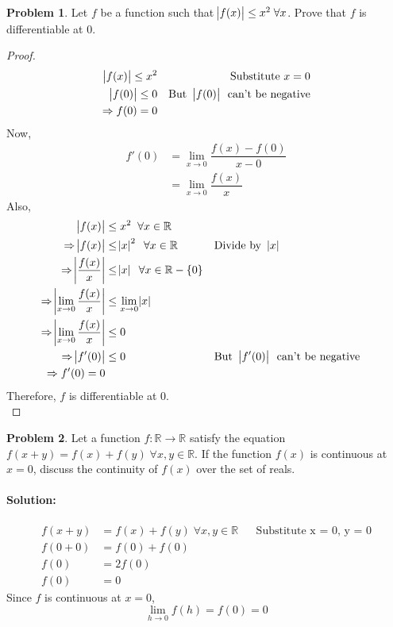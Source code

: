 \documentclass[14]{article}
\theoremstyle{definition}
\newtheorem{prob}{Problem}
\begin{document}
\pagebreak
\begin{prob}
Let $f$ be a function such that $\abs{f(x)} \leq x^2 \; \forall x$. Prove that $f$ is differentiable at 0.
\begin{proof}
\begin{align*}
\abs{f(x)} \leq x^2 && \text{Substitute $x = 0$}\\
\abs{f(0)} \leq 0 && \text{But \abs{f(0)} can't be negative}\\
\Rightarrow f(0) = 0
\end{align*}
Now,
\begin{align*}
f'(0) &= \lim\limits_{x \to 0} \dfrac{f(x) - f(0)}{x - 0}\\
&= \lim\limits_{x \to 0} \dfrac{f(x)}{x}
\end{align*}
Also,
\begin{align*}
\abs{f(x)} &\leq x^2 \;\; \forall x \in \mathbb{R}\\
\Rightarrow \abs{f(x)} &\leq \abs{x}^2\;\; \forall x \in \mathbb{R} && \text{Divide by \abs{x}}\\
\Rightarrow \abs{\dfrac{f(x)}{x}} &\leq \abs{x}\;\; \forall x \in \mathbb{R} - \{0\}\\
\Rightarrow \abs{\lim\limits_{x \to 0} \dfrac{f(x)}{x}} &\leq \lim\limits_{x \to 0} \abs{x}\\
\Rightarrow \abs{\lim\limits_{x \to 0} \dfrac{f(x)}{x}} &\leq 0\\
\Rightarrow \abs{f'(0)} &\leq 0 && \text{But \abs{f'(0)} can't be negative}\\
\Rightarrow f'(0) = 0
\end{align*}
Therefore, $f$ is differentiable at 0.\\
\end{proof}
\end{prob}
\begin{prob}
Let a function $f : \mathbb{R} \to \mathbb{R}$ satisfy the equation $f(x + y) = f(x) + f(y) \; \forall x, y \in \mathbb{R}$. If the function $f(x)$ is continuous at $x = 0$, discuss the continuity of $f(x)$ over the set of reals.
\paragraph{Solution:}
\begin{align*}
f(x + y) &= f(x) + f(y)\;\forall x, y\in \mathbb{R} && \text{Substitute x = 0, y = 0}\\
f(0 + 0) &= f(0) + f(0)\\
f(0) &= 2 f(0)\\
f(0) &= 0
\end{align*}
Since $f$ is continuous at $x = 0$,
\[\lim\limits_{h \to 0} f(h) = f(0) = 0\]
\end{prob}
\end{document}
